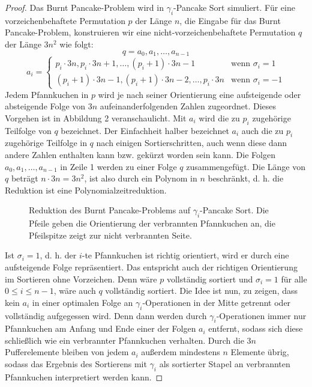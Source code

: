 \documentclass[a4paper, 10pt, ngerman]{article}
\begin{document}
\begin{proof}
    Das Burnt Pancake-Problem wird in $\gamma_i$-Pancake Sort simuliert. Für eine vorzeichenbehaftete Permutation $p$ der Länge $n$, die Eingabe für das Burnt Pancake-Problem, konstruieren wir eine nicht-vorzeichenbehaftete Permutation $q$ der Länge $3n^2$ wie folgt:
    $$
        q = a_0, a_1, \dots, a_{n-1}
    $$
    $$
        a_i  = \begin{cases}
            p_i \cdot 3n, p_i \cdot 3n + 1, \dots, (p_i + 1) \cdot 3n - 1 
            & \text{wenn } \sigma_i = 1  \\
            (p_i + 1) \cdot 3n - 1, (p_i + 1) \cdot 3n - 2, \dots, p_i \cdot 3n       
            & \text{wenn } \sigma_i = -1
        \end{cases}
    $$
    Jedem Pfannkuchen in $p$ wird je nach seiner Orientierung eine aufsteigende oder absteigende Folge von $3n$ aufeinanderfolgenden Zahlen zugeordnet. Dieses Vorgehen ist in Abbildung 2 veranschaulicht. Mit $a_i$ wird die zu $p_i$ zugehörige Teilfolge von $q$ bezeichnet. Der Einfachheit halber bezeichnet $a_i$ auch die zu $p_i$ zugehörige Teilfolge in $q$ nach einigen Sortierschritten, auch wenn diese dann andere Zahlen enthalten kann bzw. gekürzt worden sein kann. Die Folgen $a_0, a_1, \dots, a_{n-1}$ in Zeile 1 werden zu einer Folge $q$ zusammengefügt. Die Länge von $q$ beträgt $n \cdot 3n = 3n^2$, ist also durch ein Polynom in $n$ beschränkt, d. h. die Reduktion ist eine Polynomialzeitreduktion.

    \begin{figure}[h]
        \centering
        
        \caption{Reduktion des Burnt Pancake-Problems auf $\gamma_i$-Pancake Sort. Die Pfeile geben die Orientierung der verbrannten Pfannkuchen an, die Pfeilspitze zeigt zur nicht verbrannten Seite.}
    \end{figure}
    Ist $\sigma_i = 1$, d. h. der $i$-te Pfannkuchen ist richtig orientiert, wird er durch eine aufsteigende Folge repräsentiert. Das entspricht auch der richtigen Orientierung im Sortieren ohne Vorzeichen. Denn wäre $p$ vollständig sortiert und $\sigma_i = 1$ für alle $0 \le i \le n - 1$, wäre auch $q$ vollständig sortiert. Die Idee ist nun, zu zeigen, dass kein $a_i$ in einer optimalen Folge an $\gamma_i$-Operationen in der Mitte getrennt oder vollständig aufgegessen wird. Denn dann werden durch $\gamma_i$-Operationen immer nur Pfannkuchen am Anfang und Ende einer der Folgen $a_i$ entfernt, sodass sich diese schließlich wie ein verbrannter Pfannkuchen verhalten. Durch die $3n$ Pufferelemente bleiben von jedem $a_i$ außerdem mindestens $n$ Elemente übrig, sodass das Ergebnis des Sortierens mit $\gamma_i$ als sortierter Stapel an verbrannten Pfannkuchen interpretiert werden kann.


\end{proof}
\end{document}
